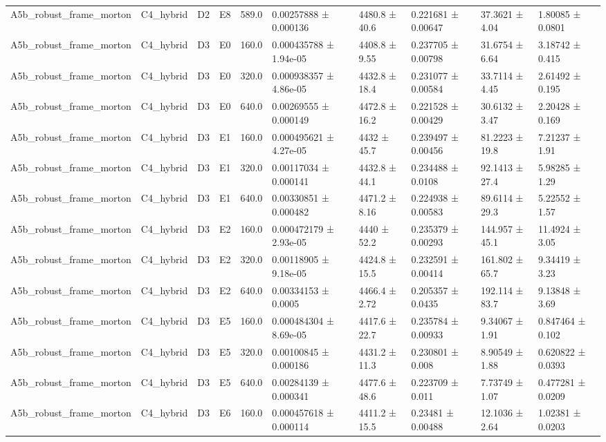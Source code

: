 \begin{table}
\begin{tabular}{llllllllll}
A5b\_robust\_frame\_morton & C4\_hybrid & D2 & E8 & 589.0 & 0.00257888 ± 0.000136 & 4480.8 ± 40.6 & 0.221681 ± 0.00647 & 37.3621 ± 4.04 & 1.80085 ± 0.0801 \\
A5b\_robust\_frame\_morton & C4\_hybrid & D3 & E0 & 160.0 & 0.000435788 ± 1.94e-05 & 4408.8 ± 9.55 & 0.237705 ± 0.00798 & 31.6754 ± 6.64 & 3.18742 ± 0.415 \\
A5b\_robust\_frame\_morton & C4\_hybrid & D3 & E0 & 320.0 & 0.000938357 ± 4.86e-05 & 4432.8 ± 18.4 & 0.231077 ± 0.00584 & 33.7114 ± 4.45 & 2.61492 ± 0.195 \\
A5b\_robust\_frame\_morton & C4\_hybrid & D3 & E0 & 640.0 & 0.00269555 ± 0.000149 & 4472.8 ± 16.2 & 0.221528 ± 0.00429 & 30.6132 ± 3.47 & 2.20428 ± 0.169 \\
A5b\_robust\_frame\_morton & C4\_hybrid & D3 & E1 & 160.0 & 0.000495621 ± 4.27e-05 & 4432 ± 45.7 & 0.239497 ± 0.00456 & 81.2223 ± 19.8 & 7.21237 ± 1.91 \\
A5b\_robust\_frame\_morton & C4\_hybrid & D3 & E1 & 320.0 & 0.00117034 ± 0.000141 & 4432.8 ± 44.1 & 0.234488 ± 0.0108 & 92.1413 ± 27.4 & 5.98285 ± 1.29 \\
A5b\_robust\_frame\_morton & C4\_hybrid & D3 & E1 & 640.0 & 0.00330851 ± 0.000482 & 4471.2 ± 8.16 & 0.224938 ± 0.00583 & 89.6114 ± 29.3 & 5.22552 ± 1.57 \\
A5b\_robust\_frame\_morton & C4\_hybrid & D3 & E2 & 160.0 & 0.000472179 ± 2.93e-05 & 4440 ± 52.2 & 0.235379 ± 0.00293 & 144.957 ± 45.1 & 11.4924 ± 3.05 \\
A5b\_robust\_frame\_morton & C4\_hybrid & D3 & E2 & 320.0 & 0.00118905 ± 9.18e-05 & 4424.8 ± 15.5 & 0.232591 ± 0.00414 & 161.802 ± 65.7 & 9.34419 ± 3.23 \\
A5b\_robust\_frame\_morton & C4\_hybrid & D3 & E2 & 640.0 & 0.00334153 ± 0.0005 & 4466.4 ± 2.72 & 0.205357 ± 0.0435 & 192.114 ± 83.7 & 9.13848 ± 3.69 \\
A5b\_robust\_frame\_morton & C4\_hybrid & D3 & E5 & 160.0 & 0.000484304 ± 8.69e-05 & 4417.6 ± 22.7 & 0.235784 ± 0.00933 & 9.34067 ± 1.91 & 0.847464 ± 0.102 \\
A5b\_robust\_frame\_morton & C4\_hybrid & D3 & E5 & 320.0 & 0.00100845 ± 0.000186 & 4431.2 ± 11.3 & 0.230801 ± 0.008 & 8.90549 ± 1.88 & 0.620822 ± 0.0393 \\
A5b\_robust\_frame\_morton & C4\_hybrid & D3 & E5 & 640.0 & 0.00284139 ± 0.000341 & 4477.6 ± 48.6 & 0.223709 ± 0.011 & 7.73749 ± 1.07 & 0.477281 ± 0.0209 \\
A5b\_robust\_frame\_morton & C4\_hybrid & D3 & E6 & 160.0 & 0.000457618 ± 0.000114 & 4411.2 ± 15.5 & 0.23481 ± 0.00488 & 12.1036 ± 2.64 & 1.02381 ± 0.0203 \\

\end{tabular}
\end{table}
